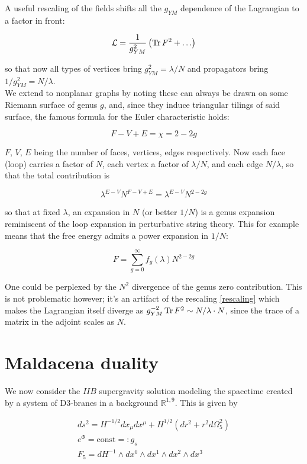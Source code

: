 A useful rescaling of the fields shifts all the $g_{YM}$ dependence of the Lagrangian to a factor in front:

\begin{equation} \label{rescaling} \mathcal{L} = \frac{1}{g_{YM}^2} \left( \operatorname{Tr} F^2 + \ldots \right) \end{equation}

so that now all types of vertices bring $g_{YM}^2 = \lambda/N$ and propagators bring $1/g_{YM}^2 = N/\lambda$.\\

We extend to nonplanar graphs by noting these can always be drawn on some Riemann surface of genus $g$, and, since they induce triangular tilings of said surface, the famous formula for the Euler characteristic holds:

\[ F - V + E = \chi = 2 - 2g \]

$F$, $V$, $E$ being the number of faces, vertices, edges respectively. Now each face (loop) carries a factor of $N$, each vertex a factor of $\lambda/N$, and each edge $N/\lambda$, so that the total contribution is

\[ \lambda^{E-V} N^{F-V+E} = \lambda^{E-V} N^{2-2g} \]

so that at fixed $\lambda$, an expansion in $N$ (or better $1/N$) is a genus expansion reminiscent of the loop expansion in perturbative string theory. This for example means that the free energy admits a power expansion in $1/N$:

\begin{equation}
F = \sum_{g=0}^\infty f_g(\lambda) N^{2-2g}
\end{equation}

One could be perplexed by the $N^2$ divergence of the genus zero contribution. This is not problematic however; it's an artifact of the rescaling \ref{rescaling} which makes the Lagrangian itself diverge as $g_{YM}^{-2} \operatorname{Tr} F^2 \sim N/\lambda \cdot N$, since the trace of a matrix in the adjoint scales as $N$.



\section{Maldacena duality}

We now consider the $IIB$ supergravity solution modeling the spacetime created by a system of D3-branes in a background $\mathbb{R}^{1,9}$. This is given by

\begin{align}
	ds^2 = H^{-1/2} dx_\mu dx^\mu + H^{1/2} (dr^2 + r^2 d\Omega^2_5)\label{black3metric}\\	
	e^\Phi = \mathrm{const} =: g_s \\
	F_5 = dH^{-1} \wedge dx^0 \wedge dx^1 \wedge dx^2 \wedge dx^3
\end{align}

